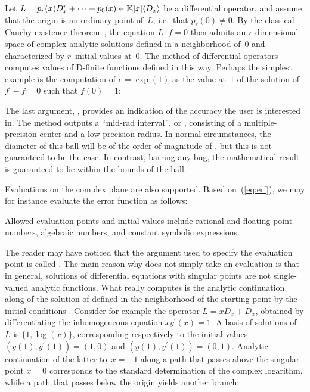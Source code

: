 \documentclass[runningheads,a4paper]{llncs}
\begin{document}
Let $L = p_r (x) D_x^r + \cdots + p_0 (x) \in \mathbbm{K} [x] \langle D_x
\rangle$ be a differential operator, and assume that the origin is an ordinary
point of~$L$, i.e.\ that $p_r (0) \neq 0$. By the classical Cauchy existence
theorem~\cite{Hille1976}, the equation $L \cdot f = 0$ then admits an $r$\mbox{-}dimensional
space of complex analytic solutions defined in a neighborhood of~$0$ and
characterized by $r$~initial values at~$0$. The
 method of differential operators computes
values of D-finite functions defined in this way. Perhaps the simplest example
is the computation of $e = \exp (1)$ as the value at~$1$ of the solution of
$f^{\prime} - f = 0$ such that $f (0) = 1$:


{\noindent}The last argument, , provides an indication of the
accuracy the user is interested in. The method outputs a ``mid-rad interval'',
or {}, consisting of a multiple-precision center and a
low-precision radius. In normal circumstances, the diameter of this ball will
be of the order of magnitude of , but this is not guaranteed to
be the case. In contrast, barring any bug, the mathematical result is
guaranteed to lie within the bounds of the ball.

Evaluations on the complex plane are also supported. Based on~(\ref{eq:erf}),
we may for instance evaluate the error function as follows:
\enlargethispage{\baselineskip}


{\noindent}Allowed evaluation points and initial values include rational and
floating-point numbers, algebraic numbers, and constant symbolic expressions.

The reader may have noticed that the argument used to specify the evaluation
point is called {}. The main reason why
 does not simply take an evaluation
{} is that in general, solutions of differential equations with
singular points are not single-valued analytic functions. What
 really computes is the
analytic continuation along  of the solution of
 defined in the neighborhood of the starting point by the
initial conditions . Consider for example the operator $L = xD_x
+ D_x$, obtained by differentiating the inhomogeneous equation $xy^{\prime}
(x) = 1$. A basis of solutions of~$L$ is $\{ 1, \log (x) \}$, corresponding
respectively to the initial values $(y (1), y^{\prime} (1)) = (1, 0)$ and $(y
(1), y^{\prime} (1)) = (0, 1)$. Analytic continuation of the latter to~$x=-1$ along a
path that passes above the singular point $x = 0$ corresponds to the standard
determination of the complex logarithm, while a path that passes below the
origin yields another branch:
\end{document}
